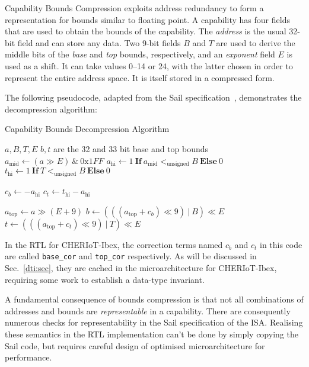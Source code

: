 \documentclass[10pt,conference]{IEEEtran}
\begin{document}
Capability Bounds Compression exploits address redundancy to form a
representation for bounds similar to floating point. A capability has four
fields that are used to obtain the bounds of the capability. The
\textit{address} is the usual 32-bit field and can store any data. Two
9-bit fields $B$ and $T$ are used to derive the middle bits
of the \textit{base} and \textit{top} bounds, respectively, and an
\textit{exponent} field $E$ is used as a shift. It can take values 0--14 or 24,
with the latter chosen in order to represent the entire address space. It is itself
stored in a compressed form.

The following pseudocode, adapted from the Sail specification~\cite{cheriot-sail},
demonstrates the decompression algorithm:

\begin{algorithm}
  \caption{Capability Bounds Decompression Algorithm}\label{alg:cap}
  \begin{algorithmic}
    \Require $a, B, T, E$
    \Ensure $b, t$ are the 32 and 33 bit base and top bounds
    \State $a_\text{mid} \gets (a \gg E) ~ \& ~ 0\text{x}1FF$
    \State $a_\text{hi} \gets 1 ~ \textbf{If} ~ a_\text{mid} <_\text{unsigned} B ~ \textbf{Else} ~ 0$
    \State $t_\text{hi} \gets 1 ~ \textbf{If} ~ T <_\text{unsigned} B ~ \textbf{Else} ~ 0$
    
    \State $c_b \gets -a_\text{hi}$ %
    \State $c_t \gets t_\text{hi} - a_\text{hi}$ %
    
    \State $a_\text{top} \gets a \gg (E + 9)$
    \State $b \gets (((a_\text{top} + c_b) \ll 9) ~ | ~ B) \ll E$
    \State $t \gets (((a_\text{top} + c_t) \ll 9) ~ | ~ T) \ll E$
  \end{algorithmic}
\end{algorithm}

\noindent In the RTL for CHERIoT-Ibex, the correction terms named $c_b$ and
$c_t$ in this code are called \verb|base_cor| and \verb|top_cor|
respectively. As will be discussed in Sec.~\ref{dti:sec}, they are cached
in the microarchitecture for CHERIoT-Ibex, requiring some work to establish
a data-type invariant.

A fundamental consequence of bounds compression is that not all
combinations of addresses and bounds are \textit{representable} in a
capability. There are consequently numerous checks for representability in
the Sail specification of the ISA. Realising these semantics in the RTL
implementation can't be done by simply copying the Sail code, but requires careful design
of optimised microarchitecture for performance.
\end{document}
